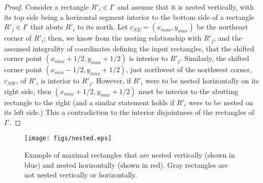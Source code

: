 \documentclass{article}
\begin{document}
\begin{proof}
  Consider a rectangle $R'_i\in I'$ and assume that it is nested
  vertically, with its top side being a horizontal segment interior to
  the bottom side of a rectangle $R'_j\in I'$ that abuts $R'_i$ to its
  north. Let $c_{NE}=(x_{max},y_{max})$ be the northeast corner of
  $R'_i$; then, we know from the nesting relationship with $R'_j$, and the assumed integrality of
  coordinates defining the input rectangles, 
  that the shifted corner point
  $(x_{max}+1/2,y_{max}+1/2)$ is interior to $R'_j$. Similarly, the shifted corner point
  $(x_{min}-1/2,y_{max}+1/2)$, just northwest of the northwest
  corner, $c_{NW}$, of $R'_i$ is interior to $R'_j$.  However, if
  $R'_i$ were to be nested horizontally on its right side, then
  $(x_{max}+1/2,y_{max}+1/2)$ must be interior to the abutting
  rectangle to the right (and a similar statement holds if $R'_i$ were
  to be nested on its left side.) This a contradiction to the interior
  disjointness of the rectangles of~$I'$.
\end{proof}

\begin{figure*}[!ht]
	\centering
	\texttt{[image: figs/nested.eps]}
	\caption{Example of maximal rectangles that are nested
          vertically (shown in blue) and nested horizontally (shown in
          red). Gray rectangles are not nested vertically or
          horizontally.}
	\label{fig:nested}
\end{figure*}
\end{document}
